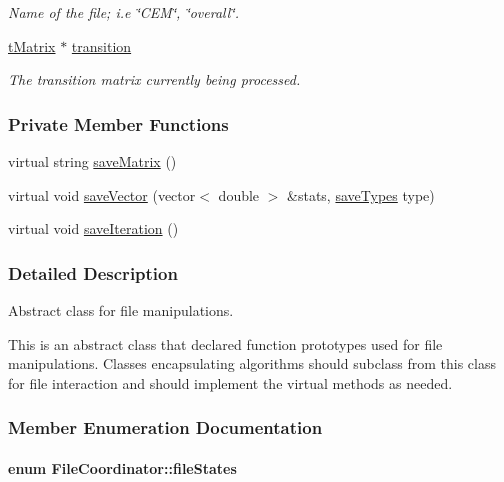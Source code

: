 \begin{DoxyCompactItemize}
\begin{DoxyCompactList}\small\item\em Name of the file; i.\+e \char`\"{}\+C\+E\+M\char`\"{}, \char`\"{}overall\char`\"{}. \end{DoxyCompactList}\item 
\hypertarget{class_file_coordinator_a73af7cec077de88eebd7a33fad13ef23}{\hyperlink{classt_matrix}{t\+Matrix} $\ast$ \hyperlink{class_file_coordinator_a73af7cec077de88eebd7a33fad13ef23}{transition}}\label{class_file_coordinator_a73af7cec077de88eebd7a33fad13ef23}

\begin{DoxyCompactList}\small\item\em The transition matrix currently being processed. \end{DoxyCompactList}\end{DoxyCompactItemize}
\subsubsection*{Private Member Functions}
\begin{DoxyCompactItemize}
\item 
virtual string \hyperlink{class_file_coordinator_a913c584fd94fdcacd120bf6f52819aad}{save\+Matrix} ()
\item 
virtual void \hyperlink{class_file_coordinator_a2d9b661099244a87012a4f7de9d3a120}{save\+Vector} (vector$<$ double $>$ \&stats, \hyperlink{class_file_coordinator_a3675d464de774750ec143958d199891e}{save\+Types} type)
\item 
virtual void \hyperlink{class_file_coordinator_a53023597e8e80b9f6bb4f7edb16b098c}{save\+Iteration} ()
\end{DoxyCompactItemize}


\subsubsection{Detailed Description}
Abstract class for file manipulations. 

This is an abstract class that declared function prototypes used for file manipulations. Classes encapsulating algorithms should subclass from this class for file interaction and should implement the virtual methods as needed. 

\subsubsection{Member Enumeration Documentation}
\hypertarget{class_file_coordinator_a87882b51519fff558b11f4862a021318}{
\paragraph[{file\+States}]{\setlength{\rightskip}{0pt plus 5cm}enum {\bf File\+Coordinator\+::file\+States}}}\label{class_file_coordinator_a87882b51519fff558b11f4862a021318}


